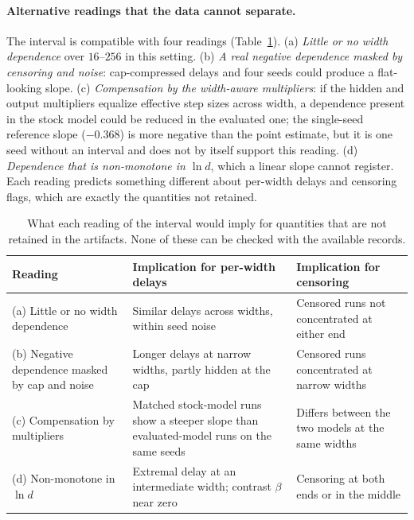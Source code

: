 \documentclass{article}
\begin{document}
\paragraph{Alternative readings that the data cannot separate.} The interval is compatible with four readings (Table~\ref{tab:readings}). (a) \emph{Little or no width dependence} over $16$--$256$ in this setting. (b) \emph{A real negative dependence masked by censoring and noise}: cap-compressed delays and four seeds could produce a flat-looking slope. (c) \emph{Compensation by the width-aware multipliers}: if the hidden and output multipliers equalize effective step sizes across width, a dependence present in the stock model could be reduced in the evaluated one; the single-seed reference slope ($-0.368$) is more negative than the point estimate, but it is one seed without an interval and does not by itself support this reading. (d) \emph{Dependence that is non-monotone in $\ln d$}, which a linear slope cannot register. Each reading predicts something different about per-width delays and censoring flags, which are exactly the quantities not retained.

\begin{table}[t]
\centering
\caption{What each reading of the interval would imply for quantities that are not retained in the artifacts. None of these can be checked with the available records.}
\label{tab:readings}
\small
\begin{tabular}{p{}p{}p{}}
\toprule
Reading & Implication for per-width delays & Implication for censoring \\
\midrule
(a) Little or no width dependence & Similar delays across widths, within seed noise & Censored runs not concentrated at either end \\
(b) Negative dependence masked by cap and noise & Longer delays at narrow widths, partly hidden at the cap & Censored runs concentrated at narrow widths \\
(c) Compensation by multipliers & Matched stock-model runs show a steeper slope than evaluated-model runs on the same seeds & Differs between the two models at the same widths \\
(d) Non-monotone in $\ln d$ & Extremal delay at an intermediate width; contrast $\beta$ near zero & Censoring at both ends or in the middle \\
\bottomrule
\end{tabular}
\end{table}
\end{document}
